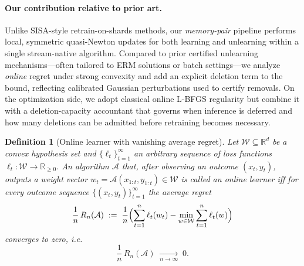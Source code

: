 \documentclass{article}
\theoremstyle{ssltheorem}
\newtheorem{definition}{Definition}
\begin{document}
\paragraph{Our contribution relative to prior art.}
Unlike SISA-style retrain-on-shards methods, our \emph{memory-pair} pipeline performs local, symmetric quasi-Newton updates for both learning and unlearning within a single stream-native algorithm.
Compared to prior certified unlearning mechanisms—often tailored to ERM solutions or batch settings—we analyze \emph{online} regret under strong convexity and add an explicit deletion term to the bound, reflecting calibrated Gaussian perturbations used to certify removals.
On the optimization side, we adopt classical online L-BFGS regularity but combine it with a deletion-capacity accountant that governs when inference is deferred and how many deletions can be admitted before retraining becomes necessary.
\begin{definition}[Online learner with vanishing average regret]
\label{def:online-learner}
Let $\mathcal W \subseteq \mathbb{R}^d$ be a convex hypothesis set and $\{\ell_{t}\}_{t=1}^{\infty}$ an arbitrary sequence of loss functions $\ell_{t} : \mathcal {W} \to \mathbb{R}_{\ge 0}$.
An algorithm $\mathcal{A}$ that, after observing an outcome $(x_{t},y_{t})$, outputs a weight vector $w_{t} = \mathcal A(x_{1:t},y_{1:t}) \in \mathcal{W}$ is called an \emph{online learner} iff for every outcome sequence $\{(x_{t},y_{t})\}_{t=1}^{\infty}$ the average regret
$$
  \frac{1}{n}\,R_{n}(\mathcal{A})
  \;:=\;
\frac{1}{n}
  \Bigl(
    \sum_{t=1}^{n}\ell_{t}(w_{t})
    -
    \min_{w\in\mathcal W}\sum_{t=1}^{n}\ell_{t}(w)
  \Bigr)
$$
converges to zero,
i.e.
$$
  \frac{1}{n}\,R_{n}(\mathcal{A})
  \;\xrightarrow[n\to\infty]{}\;0.
$$
\end{definition}
\end{document}
